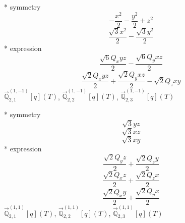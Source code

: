 \documentclass[fleqn,8pt]{jsarticle}
\begin{document}
\noindent\quad ** symmetry
\begin{dmath*}
- \frac{x^{2}}{2} - \frac{y^{2}}{2} + z^{2}
\end{dmath*}
\begin{dmath*}
\frac{\sqrt{3} x^{2}}{2} - \frac{\sqrt{3} y^{2}}{2}
\end{dmath*}
\noindent\quad ** expression
\begin{dmath*}
\frac{\sqrt{6} Q_{x} y z}{2} - \frac{\sqrt{6} Q_{y} x z}{2}
\end{dmath*}
\begin{dmath*}
\frac{\sqrt{2} Q_{x} y z}{2} + \frac{\sqrt{2} Q_{y} x z}{2} - \sqrt{2} Q_{z} x y
\end{dmath*}
\noindent\quad $\vec{\mathbb{Q}}_{2,1}^{(1,-1)}[q](T)$, $\vec{\mathbb{Q}}_{2,2}^{(1,-1)}[q](T)$, $\vec{\mathbb{Q}}_{2,3}^{(1,-1)}[q](T)$

\noindent\quad ** symmetry
\begin{dmath*}
\sqrt{3} y z
\end{dmath*}
\begin{dmath*}
\sqrt{3} x z
\end{dmath*}
\begin{dmath*}
\sqrt{3} x y
\end{dmath*}
\noindent\quad ** expression
\begin{dmath*}
\frac{\sqrt{2} Q_{y} z}{2} + \frac{\sqrt{2} Q_{z} y}{2}
\end{dmath*}
\begin{dmath*}
\frac{\sqrt{2} Q_{x} z}{2} + \frac{\sqrt{2} Q_{z} x}{2}
\end{dmath*}
\begin{dmath*}
\frac{\sqrt{2} Q_{x} y}{2} + \frac{\sqrt{2} Q_{y} x}{2}
\end{dmath*}
\noindent\quad $\vec{\mathbb{Q}}_{2,1}^{(1,1)}[q](T)$, $\vec{\mathbb{Q}}_{2,2}^{(1,1)}[q](T)$, $\vec{\mathbb{Q}}_{2,3}^{(1,1)}[q](T)$
\end{document}
